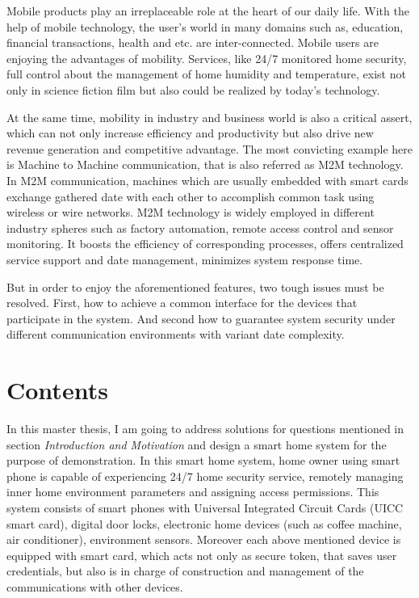 \documentclass[]{llncs}
\begin{document}
Mobile products  play an irreplaceable role at the heart of our  daily life. With the help of mobile technology, the user's world in many domains such as, education, financial transactions, health and etc. are inter-connected. Mobile users are enjoying the advantages of mobility. Services, like 24/7 monitored home security, full control about the management of home humidity and temperature, exist not only in science fiction film but also could be realized by today's technology.

At the same time, mobility in industry and business world is also a critical  assert, which can not only increase efficiency and productivity but also drive new revenue generation and competitive advantage. The most convicting example here is Machine to Machine communication, that is also referred as M2M technology. In M2M communication, machines which are usually embedded with smart cards exchange gathered date with each other to accomplish common task using wireless or wire networks. M2M technology is widely employed in different industry spheres such as factory automation, remote access control and sensor monitoring. It boosts the efficiency of corresponding processes, offers centralized service support and date management, minimizes system response time.

But in order to enjoy the aforementioned features, two tough issues must be resolved. First, how to achieve a common interface for the devices that participate in the system.  And second how to guarantee system security under different communication environments with variant date complexity.
\section{Contents}
In this master thesis, I am going to address solutions for questions mentioned in  section \emph{Introduction and Motivation} and  design a smart home system for the purpose of demonstration. In this smart home system, home owner using smart phone is capable of experiencing 24/7 home security service, remotely managing inner home environment parameters and assigning access permissions. This system consists of smart phones with Universal Integrated Circuit Cards (UICC  smart card), digital door locks, electronic home devices (such as coffee machine, air conditioner), environment sensors. Moreover each above mentioned  device is equipped with smart card, which acts not only as secure token, that saves  user credentials, but also is in charge of  construction and management of the communications with other devices.
\end{document}
